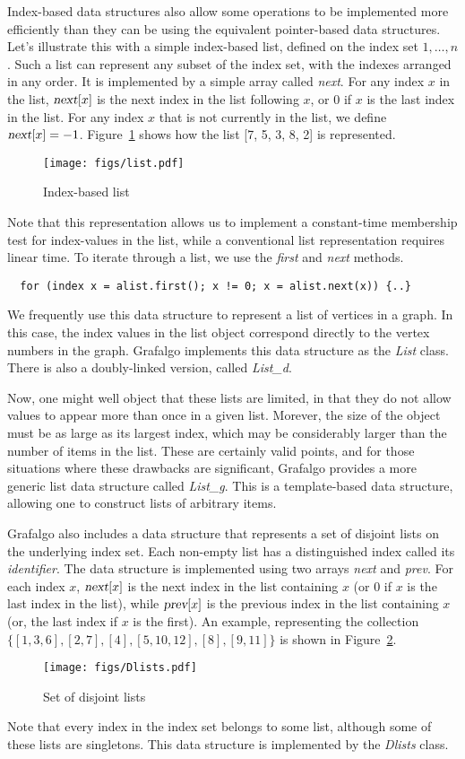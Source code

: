 \documentclass[11pt]{article}
\begin{document}
Index-based data structures also allow some operations to be implemented more efficiently than
they can be using the equivalent pointer-based data structures. 
Let's illustrate this with a simple index-based list,
defined on the index set $1,\ldots,n$. Such a list can represent any subset of the index set,
with the indexes arranged in any order. 
It is implemented by a simple array called {\sl next}. For any index $x$ in the list,
$\textsl{next}[x]$ is the next index in the list following $x$, or 0 if $x$ is the last index in the list.
For any index $x$ that is not currently in the list, we define $\textsl{next}[x]=-1$.
Figure~\ref{indexList} shows how the list [7, 5, 3, 8, 2] is represented.
\begin{figure}[h]
\centerline{ \texttt{[image: figs/list.pdf]} }
\caption{Index-based list}
\label{indexList}
\end{figure}
Note that this representation allows us to implement a constant-time membership test for
index-values in the list, while a conventional list representation requires linear time.
To iterate through a list, we use the {\sl first} and {\sl next} methods.
\begin{verbatim}
  for (index x = alist.first(); x != 0; x = alist.next(x)) {..}
\end{verbatim}
We frequently use this data structure to represent a list of vertices in a graph.
In this case, the index values in the list object correspond directly to the vertex numbers in the graph.
Grafalgo implements this data structure as the {\sl List} class. 
There is also a doubly-linked version, called {\sl List\_d}.

Now, one might well object that these lists are limited, in that they do not allow
values to appear more than once in a given list. Morever, the size of the object must be as
large as its largest index, which may be considerably larger than the number of items in the list.
These are certainly valid points, and for those situations where these drawbacks are significant,
Grafalgo provides a more generic list data structure called {\sl List\_g}. 
This is a template-based data structure, allowing one to construct lists of arbitrary items.

Grafalgo also includes a data structure that represents a set of
disjoint lists on the underlying index set. Each non-empty list has a distinguished index
called its {\sl identifier}.
The data structure is implemented using two arrays {\sl next} and {\sl prev}.
For each index $x$, $\textsl{next}[x]$ is the next index in the list containing $x$ (or 0 if $x$
is the last index in the list),
while $\textsl{prev}[x]$ is the previous index in the list containing $x$
(or, the last index if $x$ is the first).
An example, representing the collection $\{[1,3,6],[2,7],[4],[5,10,12],[8],[9,11]\}$ 
is shown in Figure~\ref{Dlists}.
\begin{figure}[h]
\centerline{\texttt{[image: figs/Dlists.pdf]}}
\caption{Set of disjoint lists}
\label{Dlists}
\end{figure}
Note that every index in the index set belongs to some list, although some of these
lists are singletons. This data structure is implemented by the {\sl Dlists} class. 
\end{document}
